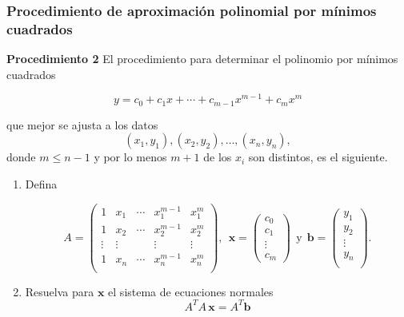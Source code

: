 {\nologo
\begin{frame}\frametitle{Procedimiento de aproximación polinomial por mínimos cuadrados}
	
	\vspace{-3mm}
	\begin{ejem}{\textbf{Procedimiento 2}}
		\justifying
		El procedimiento para determinar el polinomio por mínimos cuadrados
		
		\vspace{-2mm}
		\[
			y = c_0 + c_1 x + \cdots + c_{m-1} x^{m-1} + c_m x^m   
		\] 
		
		\vspace{-1mm}
		que mejor se ajusta a los datos
		\[
		(x_1, y_1 ), (x_2, y_2 ), \hdots ,(x_n , y_n ),
		\]
		donde $m\leq n-1$ y por lo menos $m + 1$ de los $x_i$ son distintos, es el siguiente.
		

		\begin{enumerate}\justifying
			\item Defina
			
			\vspace{-4mm}
			\[						
			A = 
			\left(
			\begin{array}{ccccc}
				1 & x_1 & \cdots & x_1^{m-1} & x_1^m \\[1mm]
				1 & x_2 & \cdots & x_2^{m-1} & x_2^m \\[1mm]
				\vdots & \vdots &  & \vdots & \vdots \\[1mm]
				1 & x_n & \cdots & x_n^{m-1} & x_n^m \\[1mm]
			\end{array}
			\right),
			\ \
			\mathbf{x} = 
			\left(
			\begin{array}{c}
			c_0 \\[1mm]
			c_1 \\[1mm]
			\vdots \\[1mm]
			c_m 
			\end{array}
			\right)
			\ \ \text{y} \ \ 
			\mathbf{b} = 
			\left(
			\begin{array}{c}
			y_1  \\[1mm]
			y_2 \\[1mm]
			\vdots \\[1mm]
			y_n\\[1mm]
			\end{array}
			\right).
			\]
			
			\vspace{0mm}
			\item Resuelva para $\mathbf{x}$ el sistema de ecuaciones normales
			\[
			A^TA\, \mathbf{x} = A^T\mathbf{b}
			\]		
		\end{enumerate}
	\end{ejem}		
	
\end{frame}
}

